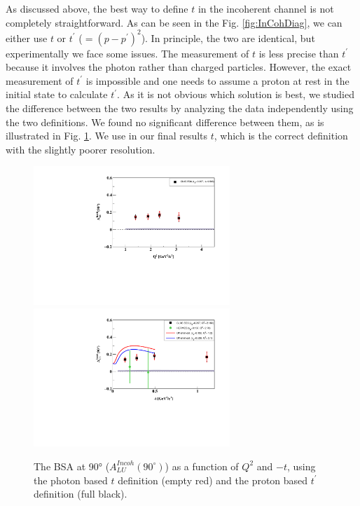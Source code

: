 \documentclass[aps,prc,preprint,superscriptaddress]{revtex4}
\begin{document}
As discussed above, the best way to define $t$ in the incoherent channel is not completely
straightforward. As can be seen in the Fig. \ref{fig:InCohDiag}, 
we can either use $t$ or $t^\prime$ ($= (p - p^\prime)^2$). In principle, the two are 
identical, but experimentally we face some issues. The measurement of $t$ is less precise than
$t^\prime$ because it involves the photon rather than charged particles. However, the 
exact measurement of $t^\prime$ is impossible and one needs to assume a proton at rest
in the initial state to calculate $t^\prime$. As it is not obvious which solution is best,
we studied the difference between the two results by analyzing the data independently using the two 
definitions. We found no significant difference between them, as is 
illustrated in Fig. \ref{fig:ttpComp}. We use in our final results $t$,
which is the correct definition with the slightly poorer resolution.

\begin{figure}[tbp!]
\center
\includegraphics[width=7.4cm]{fig3/ALU_90_p_vs_Q2_shortscenrario.pdf}
\includegraphics[width=7.4cm]{fig3/ALU_90_p_vs_t_shortscenrario.pdf}
	\caption{The BSA at 90° ($A_{LU}^{Incoh} (90^\circ)$) as a
	function of $Q^2$ and $-t$, using the photon based $t$ definition (empty red)
	and the proton based $t^\prime$ definition (full black).}
\label{fig:ttpComp}
\end{figure}
\end{document}
